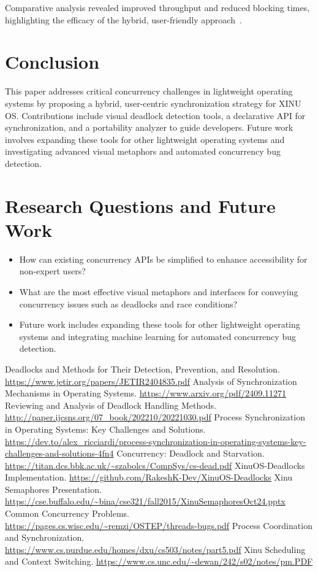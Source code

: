 \documentclass[conference,a4paper]{IEEEtran}
\begin{document}
Comparative analysis revealed improved throughput and reduced blocking times, highlighting the efficacy of the hybrid, user-friendly approach~\cite{bbk, xinuosdeadlocks}.

\section{Conclusion}

This paper addresses critical concurrency challenges in lightweight operating systems by proposing a hybrid, user-centric synchronization strategy for XINU OS. Contributions include visual deadlock detection tools, a declarative API for synchronization, and a portability analyzer to guide developers. Future work involves expanding these tools for other lightweight operating systems and investigating advanced visual metaphors and automated concurrency bug detection.

\section*{Research Questions and Future Work}

\begin{itemize}
    \item How can existing concurrency APIs be simplified to enhance accessibility for non-expert users?
    \item What are the most effective visual metaphors and interfaces for conveying concurrency issues such as deadlocks and race conditions?
    \item Future work includes expanding these tools for other lightweight operating systems and integrating machine learning for automated concurrency bug detection.
\end{itemize}

\begin{thebibliography}{10}
Deadlocks and Methods for Their Detection, Prevention, and Resolution. \url{https://www.jetir.org/papers/JETIR2404835.pdf}
Analysis of Synchronization Mechanisms in Operating Systems. \url{https://www.arxiv.org/pdf/2409.11271}
Reviewing and Analysis of Deadlock Handling Methods. \url{http://paper.ijcsns.org/07_book/202210/20221030.pdf}
Process Synchronization in Operating Systems: Key Challenges and Solutions. \url{https://dev.to/alex_ricciardi/process-synchronization-in-operating-systems-key-challenges-and-solutions-4fn4}
Concurrency: Deadlock and Starvation. \url{https://titan.dcs.bbk.ac.uk/~szabolcs/CompSys/cs-dead.pdf}
XinuOS-Deadlocks Implementation. \url{https://github.com/RakeshK-Dev/XinuOS-Deadlocks}
Xinu Semaphores Presentation. \url{https://cse.buffalo.edu/~bina/cse321/fall2015/XinuSemaphoresOct24.pptx}
Common Concurrency Problems. \url{https://pages.cs.wisc.edu/~remzi/OSTEP/threads-bugs.pdf}
Process Coordination and Synchronization. \url{https://www.cs.purdue.edu/homes/dxu/cs503/notes/part5.pdf}
Xinu Scheduling and Context Switching. \url{https://www.cs.unc.edu/~dewan/242/s02/notes/pm.PDF}
\end{thebibliography}
\end{document}
